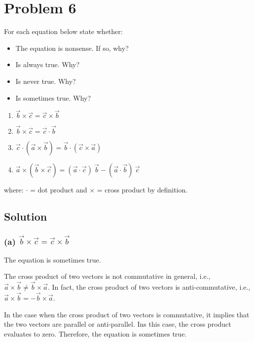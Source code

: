 \section*{Problem 6}

For each equation below state whether:
\begin{itemize}
    \item The equation is nonsense. If so, why?
    \item Is always true. Why?
    \item Is never true. Why?
    \item Is sometimes true. Why?
\end{itemize}

\begin{enumerate}[label = (\alph*)]
    \item \( \vec{b} \times \vec{c} = \vec{c} \times \vec{b} \)
    \item \( \vec{b} \times \vec{c} = \vec{c} \cdot \vec{b} \)
    \item \( \vec{c} \cdot (\vec{a} \times \vec{b}) = \vec{b} \cdot (\vec{c} \times \vec{a}) \)
    \item \( \vec{a} \times (\vec{b} \times \vec{c}) = (\vec{a} \cdot \vec{c})\ \vec{b} - (\vec{a} \cdot \vec{b})\ \vec{c} \)
\end{enumerate}
where: \( \cdot \) = dot product and \( \times \) = cross product by definition.

\subsection*{Solution}

\subsubsection*{(a) \( \vec{b} \times \vec{c} = \vec{c} \times \vec{b} \)}

The equation is sometimes true.

The cross product of two vectors is not commutative in general, i.e., \( \vec{a} \times \vec{b} \neq \vec{b} \times \vec{a} \).
In fact, the cross product of two vectors is anti-commutative, i.e., \( \vec{a} \times \vec{b} = -\vec{b} \times \vec{a} \).

In the case when the cross product of two vectors is commutative, it implies that the two vectors are parallel or anti-parallel.
Ins this case, the cross product evaluates to zero.
Therefore, the equation is sometimes true.

